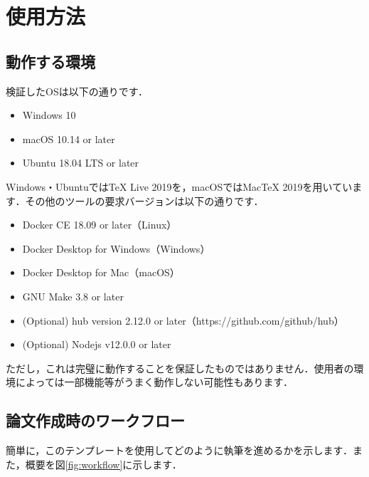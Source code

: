 \documentclass[main]{subfiles}
\begin{document}
\section{使用方法}

\subsection{動作する環境}

検証したOSは以下の通りです．

\begin{itemize}
    \item Windows 10
    \item macOS 10.14 or later
    \item Ubuntu 18.04 LTS or later
\end{itemize}

Windows・UbuntuではTeX Live 2019を，macOSではMacTeX 2019を用いています．その他のツールの要求バージョンは以下の通りです．

\begin{itemize}
    \item Docker CE 18.09 or later（Linux）
    \item Docker Desktop for Windows（Windows）
    \item Docker Desktop for Mac（macOS）
    \item GNU Make 3.8 or later
    \item (Optional) hub version 2.12.0 or later（https://github.com/github/hub）
    \item (Optional) Nodejs v12.0.0 or later
\end{itemize}

ただし，これは完璧に動作することを保証したものではありません．使用者の環境によっては一部機能等がうまく動作しない可能性もあります．

\subsection{論文作成時のワークフロー}

簡単に，このテンプレートを使用してどのように執筆を進めるかを示します．また，概要を図\ref{fig:workflow}に示します．
\end{document}
